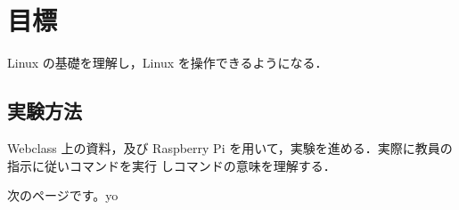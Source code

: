 \documentclass{myreport}  %
\begin{document}
\section{目標}
Linux の基礎を理解し，Linux を操作できるようになる．

\subsection{実験方法}
Webclass 上の資料，及び Raspberry Pi を用いて，実験を進める．実際に教員の指示に従いコマンドを実行
しコマンドの意味を理解する．

\newpage

次のページです。yo
\end{document}
